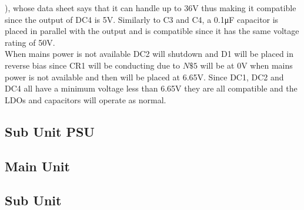 ), whose data sheet\cite{L7805CV} says that it can handle up to 36\si{\V} thus making it compatible since the output of DC4 is 5\si{\V}. Similarly to C3 and C4, a 0.1\si{\micro\farad} capacitor is placed in parallel with the output and is compatible since it has the same voltage rating of 50\si{\V}.\\ When mains power is not available DC2 will shutdown and D1 will be placed in reverse bias since CR1 will be conducting due to $N\$5$ will be at 0\si{\V} when mains power is not available and then will be placed at 6.65\si{\V}. Since DC1, DC2 and DC4 all have a minimum voltage less than 6.65\si{\V} they are all compatible and the LDOs and capacitors will operate as normal.
\subsection{Sub Unit PSU}
\subsection{Main Unit}
\subsection{Sub Unit}

